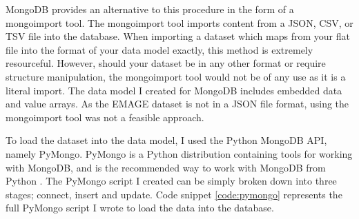MongoDB provides an alternative to this procedure in the form of a mongoimport tool. The mongoimport tool imports content from a JSON, CSV, or TSV file into the database. When importing a dataset which maps from your flat file into the format of your data model exactly, this method is extremely resourceful. However, should your dataset be in any other format or require structure manipulation, the mongoimport tool would not be of any use as it is a literal import. The data model I created for MongoDB includes embedded data and value arrays. As the EMAGE dataset is not in a JSON file format, using the mongoimport tool was not a feasible approach.

To load the dataset into the data model, I used the Python MongoDB API, namely PyMongo. PyMongo is a Python distribution containing tools for working with MongoDB, and is the recommended way to work with MongoDB from Python \cite{md}. The PyMongo script I created can be simply broken down into three stages; connect, insert and update. Code snippet \ref{code:pymongo} represents the full PyMongo script I wrote to load the data into the database.\\[2em]

